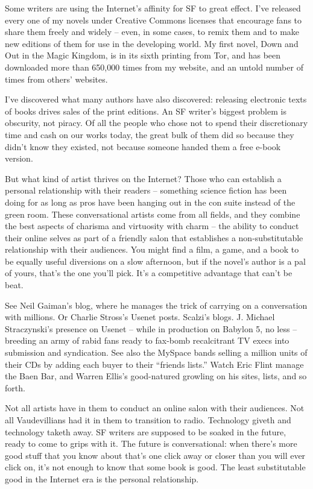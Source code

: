 Some writers are using the Internet's affinity for SF to great
effect. I've released every one of my novels under Creative Commons
licenses that encourage fans to share them freely and widely --
even, in some cases, to remix them and to make new editions of them
for use in the developing world. My first novel, Down and Out in
the Magic Kingdom, is in its sixth printing from Tor, and has been
downloaded more than 650,000 times from my website, and an untold
number of times from others' websites.

I've discovered what many authors have also discovered: releasing
electronic texts of books drives sales of the print editions. An SF
writer's biggest problem is obscurity, not piracy. Of all the
people who chose not to spend their discretionary time and cash on
our works today, the great bulk of them did so because they didn't
know they existed, not because someone handed them a free e-book
version.

But what kind of artist thrives on the Internet? Those who can
establish a personal relationship with their readers -- something
science fiction has been doing for as long as pros have been
hanging out in the con suite instead of the green room. These
conversational artists come from all fields, and they combine the
best aspects of charisma and virtuosity with charm -- the ability
to conduct their online selves as part of a friendly salon that
establishes a non-substitutable relationship with their audiences.
You might find a film, a game, and a book to be equally useful
diversions on a slow afternoon, but if the novel's author is a pal
of yours, that's the one you'll pick. It's a competitive advantage
that can't be beat.

See Neil Gaiman's blog, where he manages the trick of carrying on a
conversation with millions. Or Charlie Stross's Usenet posts.
Scalzi's blogs. J. Michael Straczynski's presence on Usenet --
while in production on Babylon 5, no less -- breeding an army of
rabid fans ready to fax-bomb recalcitrant TV execs into submission
and syndication. See also the MySpace bands selling a million units
of their CDs by adding each buyer to their ``friends lists.'' Watch
Eric Flint manage the Baen Bar, and Warren Ellis's good-natured
growling on his sites, lists, and so forth.

Not all artists have in them to conduct an online salon with their
audiences. Not all Vaudevillians had it in them to transition to
radio. Technology giveth and technology taketh away. SF writers are
supposed to be soaked in the future, ready to come to grips with
it. The future is conversational: when there's more good stuff that
you know about that's one click away or closer than you will ever
click on, it's not enough to know that some book is good. The least
substitutable good in the Internet era is the personal
relationship.

